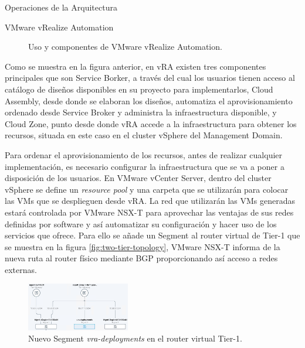 \begin{subsection}{Operaciones de la Arquitectura}
\begin{subsubsection}{VMware vRealize Automation}
\begin{figure}[h]
            \caption{Uso y componentes de VMware vRealize Automation.}
            \label{fig:vra-components}
        \end{figure}
        \FloatBarrier
        Como se muestra en la figura anterior, en vRA existen tres componentes principales que son Service Borker, a través del cual los usuarios tienen acceso al catálogo de diseños disponibles en su proyecto para implementarlos, Cloud Assembly, desde donde se elaboran los diseños, automatiza el aprovisionamiento ordenado desde Service Broker y administra la infraestructura disponible, y Cloud Zone, punto desde donde vRA accede a la infraestructura para obtener los recursos, situada en este caso en el cluster vSphere del Management Domain.

        Para ordenar el aprovisionamiento de los recursos, antes de realizar cualquier implementación, es necesario configurar la infraestructura que se va a poner a disposición de los usuarios. 
        En VMware vCenter Server, dentro del cluster vSphere se define un \textit{resource pool} y una carpeta que se utilizarán para colocar las VMs que se desplieguen desde vRA. 
        La red que utilizarán las VMs generadas estará controlada por VMware NSX-T para aprovechar las ventajas de sus redes definidas por software y así automatizar su configuración y hacer uso de los servicios que ofrece. Para ello se añade un Segment al router virtual de Tier-1 que se muestra en la figura \ref{fig:two-tier-topology}, VMware NSX-T informa de la nueva ruta al router físico mediante BGP proporcionando así acceso a redes externas.
        \begin{figure}[h]
            \centering
            \includegraphics[width=0.4\textwidth]{imaxes/pruebaconcepto/vrealize/topology-for-vRA-NSXT.png}
            \caption{Nuevo Segment \textit{vra-deployments} en el router virtual Tier-1.}
            \label{fig:topology-nsx-t-vra}
        \end{figure}
        \FloatBarrier

\end{subsubsection}
\end{subsection}
